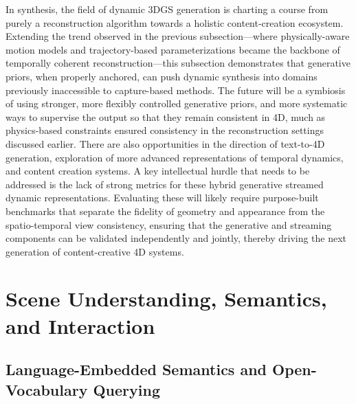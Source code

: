 \documentclass[11pt,a4paper]{article}
\begin{document}
In synthesis, the field of dynamic 3DGS generation is charting a course from purely a reconstruction algorithm towards a holistic content-creation ecosystem. Extending the trend observed in the previous subsection---where physically-aware motion models and trajectory-based parameterizations became the backbone of temporally coherent reconstruction---this subsection demonstrates that generative priors, when properly anchored, can push dynamic synthesis into domains previously inaccessible to capture-based methods. The future will be a symbiosis of using stronger, more flexibly controlled generative priors, and more systematic ways to supervise the output so that they remain consistent in 4D, much as physics-based constraints ensured consistency in the reconstruction settings discussed earlier. There are also opportunities in the direction of text-to-4D generation, exploration of more advanced representations of temporal dynamics, and content creation systems. A key intellectual hurdle that needs to be addressed is the lack of strong metrics for these hybrid generative streamed dynamic representations. Evaluating these will likely require purpose-built benchmarks that separate the fidelity of geometry and appearance from the spatio-temporal view consistency, ensuring that the generative and streaming components can be validated independently and jointly, thereby driving the next generation of content-creative 4D systems.


\section{Scene Understanding, Semantics, and Interaction}



\subsection{Language-Embedded Semantics and Open-Vocabulary Querying}
\end{document}
